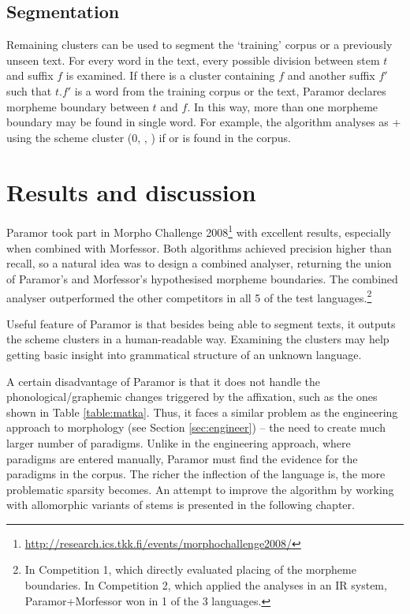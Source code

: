 \subsection{Segmentation}

Remaining clusters can be used to segment the `training' corpus or a previously unseen text. For every word in the text, every possible division between stem $t$ and suffix $f$ is examined. If there is a cluster containing $f$ and another suffix $f'$ such that $t.f'$ is a word from the training corpus or the text, Paramor declares morpheme boundary between $t$ and $f$. In this way, more than one morpheme boundary may be found in single word. For example, the algorithm analyses  as  +  using the scheme cluster (0, , ) if  or  is found in the corpus. 

\section{Results and discussion}

Paramor took part in Morpho Challenge 2008\footnote{\url{http://research.ics.tkk.fi/events/morphochallenge2008/}} with excellent results, especially when combined with Morfessor. Both algorithms achieved precision higher than recall, so a natural idea was to design a combined analyser, returning the union of Paramor's and Morfessor's hypothesised morpheme boundaries. The combined analyser outperformed the other competitors in all 5 of the test languages.\footnote{In Competition 1, which directly evaluated placing of the morpheme boundaries. In Competition 2, which applied the analyses in an IR system, Paramor+Morfessor won in 1 of the 3 languages.} 

Useful feature of Paramor is that besides being able to segment texts, it outputs the scheme clusters in a human-readable way. Examining the clusters may help getting basic insight into grammatical structure of an unknown language.

A certain disadvantage of Paramor is that it does not handle the phonological/gra\-phe\-mic changes triggered by the affixation, such as the ones shown in Table \ref{table:matka}. Thus, it faces a similar problem as the engineering approach to morphology (see Section \ref{sec:engineer}) -- the need to create much larger number of paradigms. Unlike in the engineering approach, where paradigms are entered manually, Paramor  must find the evidence for the paradigms in the corpus. The richer the inflection of the language is, the more problematic sparsity becomes. An attempt to improve the algorithm by working with allomorphic variants of stems is presented in the following chapter.
